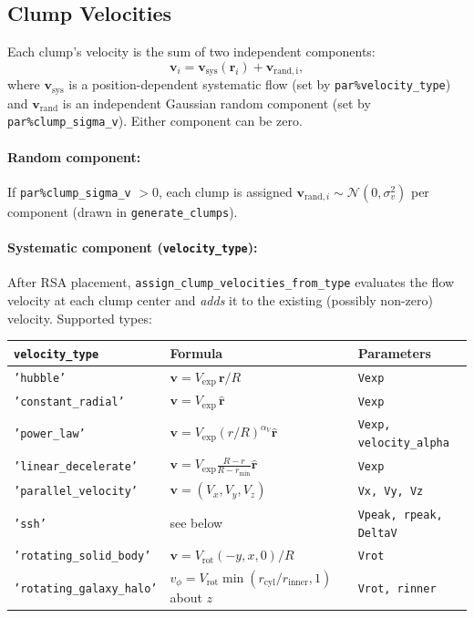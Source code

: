 \documentclass[english,a4paper]{my_memo}
\begin{document}
\subsection{Clump Velocities}

Each clump's velocity is the sum of two independent components:
\begin{equation}
  \boldsymbol{v}_i = \boldsymbol{v}_\mathrm{sys}(\mathbf{r}_i) + \boldsymbol{v}_\mathrm{rand,i},
\end{equation}
where $\boldsymbol{v}_\mathrm{sys}$ is a position-dependent systematic flow
(set by \texttt{par\%velocity\_type}) and $\boldsymbol{v}_\mathrm{rand}$ is an
independent Gaussian random component (set by \texttt{par\%clump\_sigma\_v}).
Either component can be zero.

\paragraph{Random component:}
If \texttt{par\%clump\_sigma\_v} $> 0$, each clump is assigned
$\boldsymbol{v}_{\mathrm{rand},i} \sim \mathcal{N}(0,\sigma_v^2)$ per component
(drawn in \texttt{generate\_clumps}).

\begin{sloppypar}
\paragraph{Systematic component (\texttt{velocity\_type}):}
After RSA placement, \texttt{assign\_clump\_\allowbreak{}velocities\_from\_type} evaluates
the flow velocity at each clump center and \emph{adds} it to the existing
(possibly non-zero) velocity.  Supported types:
\end{sloppypar}

\begin{center}
\begin{tabular}{lll}
\hline
\texttt{velocity\_type} & Formula & Parameters \\
\hline
\texttt{'hubble'} & $\boldsymbol{v} = V_\mathrm{exp}\,\mathbf{r}/R$ & \texttt{Vexp} \\
\texttt{'constant\_radial'} & $\boldsymbol{v} = V_\mathrm{exp}\,\hat{\mathbf{r}}$ & \texttt{Vexp} \\
\texttt{'power\_law'} & $\boldsymbol{v} = V_\mathrm{exp}(r/R)^{\alpha_V}\hat{\mathbf{r}}$ & \texttt{Vexp, velocity\_alpha} \\
\texttt{'linear\_decelerate'} & $\boldsymbol{v} = V_\mathrm{exp}\frac{R-r}{R-r_\mathrm{min}}\hat{\mathbf{r}}$ & \texttt{Vexp} \\
\texttt{'parallel\_velocity'} & $\boldsymbol{v} = (V_x, V_y, V_z)$ & \texttt{Vx, Vy, Vz} \\
\texttt{'ssh'} & see below & \texttt{Vpeak, rpeak, DeltaV} \\
\texttt{'rotating\_solid\_body'} & $\boldsymbol{v} = V_\mathrm{rot}(-y,x,0)/R$ & \texttt{Vrot} \\
\texttt{'rotating\_galaxy\_halo'} & $v_\phi = V_\mathrm{rot}\min(r_\mathrm{cyl}/r_\mathrm{inner},1)$ about $z$ & \texttt{Vrot, rinner} \\
\hline
\end{tabular}
\end{center}
\end{document}
